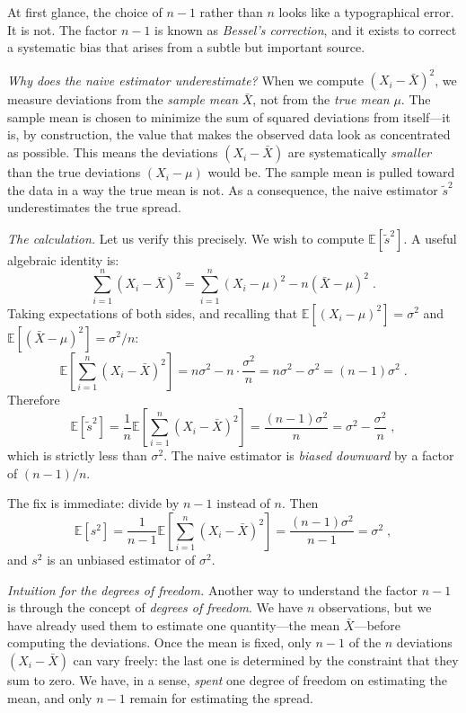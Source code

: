 At first glance, the choice of $n-1$ rather than $n$ looks like a typographical error. It is not. The factor $n-1$ is known as \textit{Bessel's correction}, and it exists to correct a systematic bias that arises from a subtle but important source.

\medskip

\textit{Why does the naive estimator underestimate?} When we compute $(X_i - \bar{X})^2$, we measure deviations from the \textit{sample mean} $\bar{X}$, not from the \textit{true mean} $\mu$. The sample mean is chosen to minimize the sum of squared deviations from itself---it is, by construction, the value that makes the observed data look as concentrated as possible. This means the deviations $(X_i - \bar{X})$ are systematically \textit{smaller} than the true deviations $(X_i - \mu)$ would be. The sample mean is pulled toward the data in a way the true mean is not. As a consequence, the naive estimator $\tilde{s}^2$ underestimates the true spread.

\medskip

\textit{The calculation.} Let us verify this precisely. We wish to compute $\mathbb{E}[\tilde{s}^2]$. A useful algebraic identity is:
\[
    \sum_{i=1}^n (X_i - \bar{X})^2
    = \sum_{i=1}^n (X_i - \mu)^2 - n(\bar{X} - \mu)^2 \; .
\]
Taking expectations of both sides, and recalling that $\mathbb{E}[(X_i - \mu)^2] = \sigma^2$ and $\mathbb{E}[(\bar{X} - \mu)^2] = \sigma^2/n$:
\[
    \mathbb{E}\!\left[\sum_{i=1}^n (X_i - \bar{X})^2\right]
    = n\sigma^2 - n \cdot \frac{\sigma^2}{n}
    = n\sigma^2 - \sigma^2
    = (n-1)\sigma^2 \; .
\]
Therefore
\[
    \mathbb{E}[\tilde{s}^2]
    = \frac{1}{n}\mathbb{E}\!\left[\sum_{i=1}^n (X_i - \bar{X})^2\right]
    = \frac{(n-1)\sigma^2}{n}
    = \sigma^2 - \frac{\sigma^2}{n} \; ,
\]
which is strictly less than $\sigma^2$. The naive estimator is \textit{biased downward} by a factor of $(n-1)/n$.

\medskip

The fix is immediate: divide by $n-1$ instead of $n$. Then
\[
    \mathbb{E}[s^2]
    = \frac{1}{n-1}\mathbb{E}\!\left[\sum_{i=1}^n (X_i - \bar{X})^2\right]
    = \frac{(n-1)\sigma^2}{n-1}
    = \sigma^2 \; ,
\]
and $s^2$ is an unbiased estimator of $\sigma^2$.

\medskip

\textit{Intuition for the degrees of freedom.} Another way to understand the factor $n-1$ is through the concept of \textit{degrees of freedom}. We have $n$ observations, but we have already used them to estimate one quantity---the mean $\bar{X}$---before computing the deviations. Once the mean is fixed, only $n-1$ of the $n$ deviations $(X_i - \bar{X})$ can vary freely: the last one is determined by the constraint that they sum to zero. We have, in a sense, \textit{spent} one degree of freedom on estimating the mean, and only $n-1$ remain for estimating the spread.

